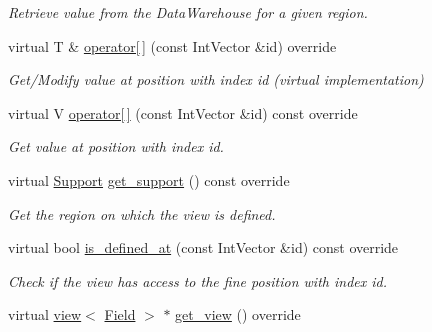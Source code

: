 \begin{DoxyCompactItemize}
\begin{DoxyCompactList}\small\item\em Retrieve value from the Data\+Warehouse for a given region. \end{DoxyCompactList}\item 
virtual T \& \hyperlink{classUintah_1_1PhaseField_1_1detail_1_1bc__fd_3_01ScalarField_3_01T_01_4_00_01STN_00_01VAR_00_01ce55d0bf8381798bc129da931b626e80_aebe3f76e4cf84f5325bfc431e6aaaad8}{operator\mbox{[}$\,$\mbox{]}} (const Int\+Vector \&id) override
\begin{DoxyCompactList}\small\item\em Get/\+Modify value at position with index id (virtual implementation) \end{DoxyCompactList}\item 
virtual V \hyperlink{classUintah_1_1PhaseField_1_1detail_1_1bc__fd_3_01ScalarField_3_01T_01_4_00_01STN_00_01VAR_00_01ce55d0bf8381798bc129da931b626e80_a115ae39eefa8454c9f88383e80f90269}{operator\mbox{[}$\,$\mbox{]}} (const Int\+Vector \&id) const override
\begin{DoxyCompactList}\small\item\em Get value at position with index id. \end{DoxyCompactList}\item 
virtual \hyperlink{classUintah_1_1PhaseField_1_1Support}{Support} \hyperlink{classUintah_1_1PhaseField_1_1detail_1_1bc__fd_3_01ScalarField_3_01T_01_4_00_01STN_00_01VAR_00_01ce55d0bf8381798bc129da931b626e80_a5538ce862e91e70376369ad7f4b17ba1}{get\+\_\+support} () const override
\begin{DoxyCompactList}\small\item\em Get the region on which the view is defined. \end{DoxyCompactList}\item 
virtual bool \hyperlink{classUintah_1_1PhaseField_1_1detail_1_1bc__fd_3_01ScalarField_3_01T_01_4_00_01STN_00_01VAR_00_01ce55d0bf8381798bc129da931b626e80_ae7959101e272906f6a4b624fa05582d2}{is\+\_\+defined\+\_\+at} (const Int\+Vector \&id) const override
\begin{DoxyCompactList}\small\item\em Check if the view has access to the fine position with index id. \end{DoxyCompactList}\item 
virtual \hyperlink{classUintah_1_1PhaseField_1_1detail_1_1view}{view}$<$ \hyperlink{structUintah_1_1PhaseField_1_1ScalarField}{Field} $>$ $\ast$ \hyperlink{classUintah_1_1PhaseField_1_1detail_1_1bc__fd_3_01ScalarField_3_01T_01_4_00_01STN_00_01VAR_00_01ce55d0bf8381798bc129da931b626e80_a579bb0bf5063314ac57aace2d8ff2c31}{get\+\_\+view} () override

\end{DoxyCompactItemize}
